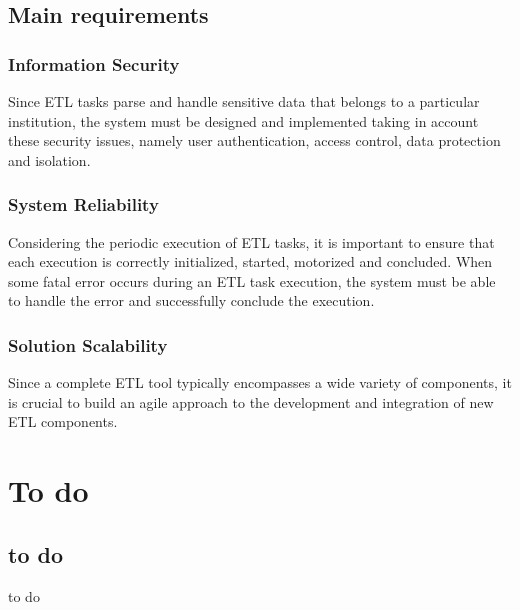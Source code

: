 \documentclass[
  11pt,
]{krantz}
\begin{document}
\hypertarget{main-requirements}{%
\section{Main requirements}\label{main-requirements}}

\hypertarget{information-security}{%
\subsection{Information Security}\label{information-security}}

Since ETL tasks parse and handle sensitive data that belongs to a particular institution, the system must be designed and implemented taking in account these security issues, namely user authentication, access control, data protection and isolation.

\hypertarget{system-reliability}{%
\subsection{System Reliability}\label{system-reliability}}

Considering the periodic execution of ETL tasks, it is important to ensure that each execution is correctly initialized, started, motorized and concluded. When some fatal error occurs during an ETL task execution, the system must be able to handle the error and successfully conclude the execution.

\hypertarget{solution-scalability}{%
\subsection{Solution Scalability}\label{solution-scalability}}

Since a complete ETL tool typically encompasses a wide variety of components, it is crucial to build an agile approach to the development and integration of new ETL components.

\hypertarget{to-do}{%
\chapter{To do}\label{to-do}}

\hypertarget{to-do-1}{%
\section{to do}\label{to-do-1}}

to do

  

\printindex
\end{document}

